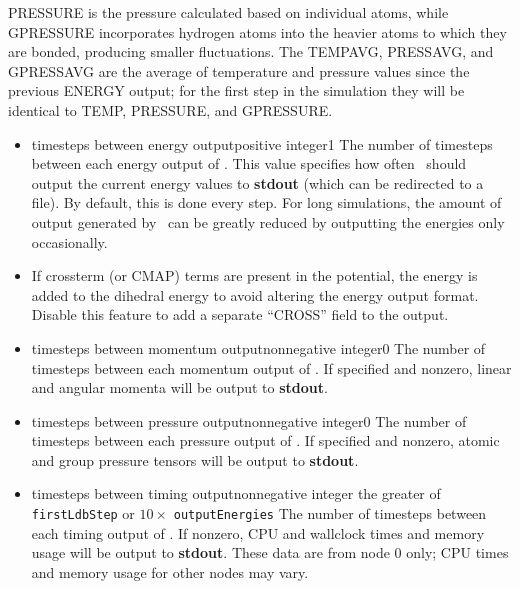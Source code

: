 PRESSURE is the pressure calculated based on individual atoms, while
GPRESSURE incorporates hydrogen atoms into the heavier atoms to which
they are bonded, producing smaller fluctuations.
The TEMPAVG, PRESSAVG, and GPRESSAVG are the average of temperature and
pressure values since the previous ENERGY output; for the first step
in the simulation they will be identical to TEMP, PRESSURE, and GPRESSURE.

\begin{itemize}
\item
{}
{timesteps between energy output}{positive integer}{1}
{
The number of timesteps between each energy output of \NAMD.  
This value
specifies how often \NAMD\ should output the current energy 
values to {\bf stdout} (which can be redirected to a file).  
By default, this is done every step.  
For long simulations, 
the amount of output generated by \NAMD\ can be greatly reduced 
by outputting the energies only occasionally.  
}

\item
{}
{
If crossterm (or CMAP) terms are present in the potential,
the energy is added to the dihedral energy to avoid altering
the energy output format.
Disable this feature to add a separate ``CROSS'' field to the output.
}

\item
{}
{timesteps between momentum output}{nonnegative integer}{0}
{
The number of timesteps between each momentum output of \NAMD.
If specified and nonzero, linear and angular momenta will be
output to {\bf stdout}.
}

\item
{}
{timesteps between pressure output}{nonnegative integer}{0}
{
The number of timesteps between each pressure output of \NAMD.
If specified and nonzero, atomic and group pressure tensors
will be output to {\bf stdout}.
}

\item
{}
{timesteps between timing output}{nonnegative integer}
{the greater of {\tt firstLdbStep} or $10 \times$ {\tt outputEnergies}}
{
The number of timesteps between each timing output of \NAMD.
If nonzero, CPU and wallclock times and memory usage will be
output to {\bf stdout}.
These data are from node 0 only; CPU times and memory usage for other nodes
may vary.
}

\end{itemize}


